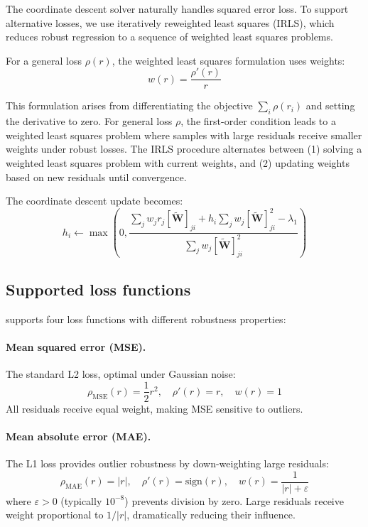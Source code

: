 \documentclass[article]{jss_modified}
\begin{document}
The coordinate descent solver naturally handles squared error loss. To support 
alternative losses, we use iteratively reweighted least squares (IRLS), which 
reduces robust regression to a sequence of weighted least squares problems.

For a general loss $\rho(r)$, the weighted least squares formulation uses 
weights:
\begin{equation}
  w(r) = \frac{\rho'(r)}{r}
  \label{eq:irls_weights}
\end{equation}

This formulation arises from differentiating the objective $\sum_i \rho(r_i)$ 
and setting the derivative to zero. For general loss $\rho$, the first-order 
condition leads to a weighted least squares problem where samples with large 
residuals receive smaller weights under robust losses. The IRLS procedure 
alternates between (1) solving a weighted least squares problem with current 
weights, and (2) updating weights based on new residuals until convergence.

The coordinate descent update becomes:
\begin{equation}
  h_i \leftarrow \max\left(0, \frac{\sum_j w_j r_j [\tilde{\mathbf{W}}]_{ji} + 
  h_i \sum_j w_j [\tilde{\mathbf{W}}]_{ji}^2 - \lambda_1}
  {\sum_j w_j [\tilde{\mathbf{W}}]_{ji}^2}\right)
  \label{eq:weighted_cd}
\end{equation}

\subsection{Supported loss functions}

 supports four loss functions with different robustness properties:

\paragraph{Mean squared error (MSE).}
The standard L2 loss, optimal under Gaussian noise:
\begin{equation}
  \rho_{\text{MSE}}(r) = \frac{1}{2}r^2, \quad \rho'(r) = r, \quad w(r) = 1
  \label{eq:mse}
\end{equation}
All residuals receive equal weight, making MSE sensitive to outliers.

\paragraph{Mean absolute error (MAE).}
The L1 loss provides outlier robustness by down-weighting large residuals:
\begin{equation}
  \rho_{\text{MAE}}(r) = |r|, \quad \rho'(r) = \text{sign}(r), \quad 
  w(r) = \frac{1}{|r| + \varepsilon}
  \label{eq:mae}
\end{equation}
where $\varepsilon > 0$ (typically $10^{-8}$) prevents division by zero. Large 
residuals receive weight proportional to $1/|r|$, dramatically reducing their 
influence.
\end{document}
